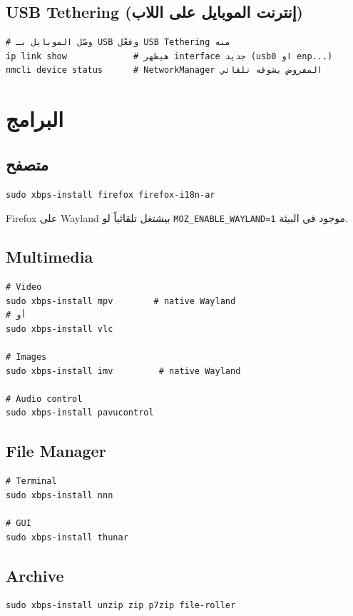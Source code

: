 \documentclass[12pt, a4paper]{report}
\begin{document}
\section{USB Tethering (إنترنت الموبايل على اللاب)}
\begin{lstlisting}
# وصّل الموبايل بـ USB وفعّل USB Tethering منه
ip link show             # هيظهر interface جديد (usb0 او enp...)
nmcli device status      # NetworkManager المفروض يشوفه تلقائي
\end{lstlisting}

\chapter{البرامج}

\section{متصفح}
\begin{lstlisting}
sudo xbps-install firefox firefox-i18n-ar
\end{lstlisting}
Firefox على Wayland بيشتغل تلقائياً لو \texttt{MOZ\_ENABLE\_WAYLAND=1} موجود في البيئة.

\section{Multimedia}
\begin{lstlisting}
# Video
sudo xbps-install mpv        # native Wayland
# أو
sudo xbps-install vlc

# Images
sudo xbps-install imv         # native Wayland

# Audio control
sudo xbps-install pavucontrol
\end{lstlisting}

\section{File Manager}
\begin{lstlisting}
# Terminal
sudo xbps-install nnn

# GUI
sudo xbps-install thunar
\end{lstlisting}

\section{Archive}
\begin{lstlisting}
sudo xbps-install unzip zip p7zip file-roller
\end{lstlisting}
\end{document}
